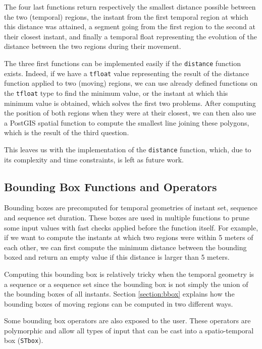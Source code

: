 The four last functions return respectively the smallest distance possible between the two (temporal) regions, the instant from the first temporal region at which this distance was attained, a segment going from the first region to the second at their closest instant, and finally a temporal float representing the evolution of the distance between the two regions during their movement. 

The three first functions can be implemented easily if the \lstinline{distance} function exists. Indeed, if we have a \lstinline+tfloat+ value representing the result of the distance function applied to two (moving) regions, we can use already defined functions on the \lstinline+tfloat+ type to find the minimum value, or the instant at which this minimum value is obtained, which solves the first two problems. After computing the position of both regions when they were at their closest, we can then also use a PostGIS spatial function to compute the smallest line joining these polygons, which is the result of the third question.

This leaves us with the implementation of the \lstinline{distance} function, which, due to its complexity and time constraints, is left as future work.

\subsection{Bounding Box Functions and Operators}
\label{section:bbox_funcs}

Bounding boxes are precomputed for temporal geometries of instant set, sequence and sequence set duration. These boxes are used in multiple functions to prune some input values with fast checks applied before the function itself. For example, if we want to compute the instants at which two regions were within 5 meters of each other, we can first compute the minimum distance between the bounding boxed and return an empty value if this distance is larger than 5 meters.

Computing this bounding box is relatively tricky when the temporal geometry is a sequence or a sequence set since the bounding box is not simply the union of the bounding boxes of all instants. Section \ref{section:bbox} explains how the bounding boxes of moving regions can be computed in two different ways.

Some bounding box operators are also exposed to the user. These operators are polymorphic and allow all types of input that can be cast into a spatio-temporal box (\lstinline+STbox+). 

